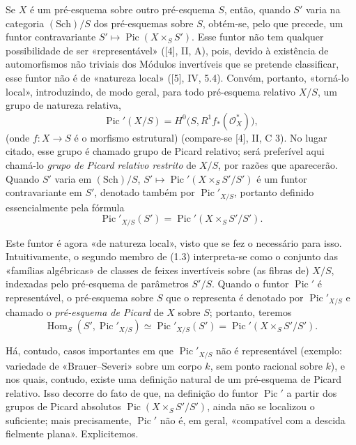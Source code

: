 \documentclass[11pt,twoside,openany]{book}
\numberwithin{equation}{section}
\newcommand{\src}[1]{%
  \phantomsection\hypertarget{src:#1}{}%
  \marginpar{\raggedleft\footnotesize\sffamily #1}%
}
\theoremstyle{plain}
\theoremstyle{definition}
\theoremstyle{remark}
\newcommand{\FgaUnitKey}{frontmatter}
\renewcommand{\src}[1]{%
  \phantomsection\hypertarget{src:\FgaUnitKey:#1}{}%
  \marginpar{\raggedleft\footnotesize\sffamily #1}%
}
\begin{document}
Se $X$ é um pré-esquema sobre outro pré-esquema $S$, então, quando $S'$ varia
na categoria $(\mathrm{Sch})/S$ dos pré-esquemas sobre $S$, obtém-se, pelo que
precede, um funtor contravariante
$S'\longmapsto\operatorname{Pic}(X\times_S S')$. Esse funtor não tem qualquer
possibilidade de ser «representável» ([4], II, A), pois, devido à existência de
automorfismos não triviais dos Módulos invertíveis que se pretende classificar,
esse funtor não é de «natureza local» ([5], IV, 5.4). Convém, portanto,
«torná-lo local», introduzindo, de modo geral, para todo pré-esquema relativo
$X/S$, um grupo de natureza relativa,
\begin{equation}
\operatorname{Pic}'(X/S)=H^0\bigl(S,R^1f_*(\mathcal O_X^*)\bigr),
\tag{1.2}
\end{equation}
(onde $f:X\longrightarrow S$ é o morfismo estrutural) (compare-se [4], II,
C 3). No lugar citado, esse grupo é chamado grupo de Picard relativo; será
preferível aqui chamá-lo \emph{grupo de Picard relativo restrito} de $X/S$,
por razões que aparecerão. Quando $S'$ varia em $(\mathrm{Sch})/S$,
$S'\longmapsto\operatorname{Pic}'(X\times_S S'/S')$ é um funtor contravariante
em $S'$, denotado também por $\operatorname{Pic}'_{X/S}$, portanto definido
essencialmente pela fórmula
\begin{equation}
\operatorname{Pic}'_{X/S}(S')=
\operatorname{Pic}'(X\times_S S'/S').
\tag{1.3}
\end{equation}
\src{144}
Este funtor é agora «de natureza local», visto que se fez o necessário para
isso. Intuitivamente, o segundo membro de (1.3) interpreta-se como o conjunto
das «famílias algébricas» de classes de feixes invertíveis sobre (as fibras de)
$X/S$, indexadas pelo pré-esquema de parâmetros $S'/S$. Quando o funtor
$\operatorname{Pic}'$ é representável, o pré-esquema sobre $S$ que o representa
é denotado por $\operatorname{Pic}'_{X/S}$ e chamado o
\emph{pré-esquema de Picard} de $X$ sobre $S$; portanto, teremos
\begin{equation}
\operatorname{Hom}_S(S',\operatorname{Pic}'_{X/S})
\simeq\operatorname{Pic}'_{X/S}(S')
=\operatorname{Pic}'(X\times_S S'/S').
\tag{1.4}
\end{equation}

Há, contudo, casos importantes em que $\operatorname{Pic}'_{X/S}$ não é
representável (exemplo: variedade de «Brauer--Severi» sobre um corpo $k$, sem
ponto racional sobre $k$), e nos quais, contudo, existe uma definição natural
de um pré-esquema de Picard relativo. Isso decorre do fato de que, na definição
do funtor $\operatorname{Pic}'$ a partir dos grupos de Picard absolutos
$\operatorname{Pic}(X\times_S S'/S')$, ainda não se localizou o suficiente;
mais precisamente, $\operatorname{Pic}'$ não é, em geral, «compatível com a
descida fielmente plana». Explicitemos.
\end{document}
